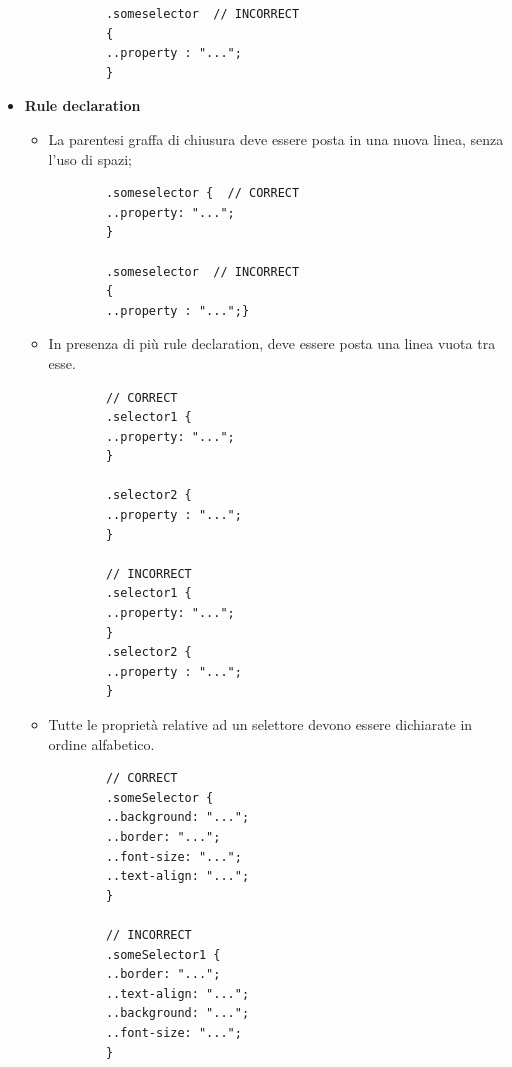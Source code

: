 \begin{itemize}
\begin{itemize}
\begin{lstlisting}
		.someselector  // INCORRECT
		{  
		..property : "...";
		}
		\end{lstlisting}
	\end{itemize}
	\item{\textbf{Rule declaration}}
	\begin{itemize}
		\item{La parentesi graffa di chiusura deve essere posta in una nuova linea, senza l'uso di spazi;}
		\begin{lstlisting}
		.someselector {  // CORRECT
		..property: "...";
		}
		
		.someselector  // INCORRECT
		{  
		..property : "...";}
		\end{lstlisting}
		
		\item{In presenza di più rule declaration, deve essere posta una linea vuota tra esse.}
		\begin{lstlisting}
		// CORRECT
		.selector1 {  
		..property: "...";
		}
		
		.selector2 {    
		..property : "...";
		}
		
		// INCORRECT
		.selector1 {  
		..property: "...";
		}
		.selector2 {    
		..property : "...";
		}
		\end{lstlisting}
		\item{Tutte le proprietà relative ad un selettore devono essere dichiarate in ordine alfabetico.}
		\begin{lstlisting}
		// CORRECT
		.someSelector {  
		..background: "...";
		..border: "...";
		..font-size: "...";
		..text-align: "...";
		}
		
		// INCORRECT
		.someSelector1 {  
		..border: "...";
		..text-align: "...";
		..background: "...";
		..font-size: "...";
		}
		\end{lstlisting}
	\end{itemize} 	
\end{itemize}

\pagebreak

